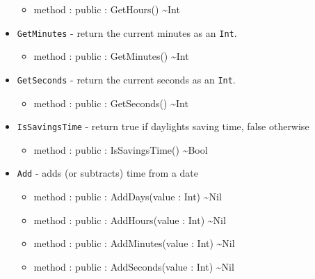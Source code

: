 \documentclass[11pt]{article}
\begin{document}
\begin{itemize}
  \begin{itemize}
  \item method : public : GetHours() \textasciitilde Int
  \end{itemize}
\item \texttt{GetMinutes} - return the current minutes as an
  \texttt{Int}.
  \begin{itemize}
  \item method : public : GetMinutes() \textasciitilde Int
  \end{itemize}
\item \texttt{GetSeconds} - return the current seconds as an
  \texttt{Int}.
  \begin{itemize}
  \item method : public : GetSeconds() \textasciitilde Int
  \end{itemize}
\item \texttt{IsSavingsTime} - return true if daylights saving time,
  false otherwise
  \begin{itemize}
  \item method : public : IsSavingsTime() \textasciitilde Bool
  \end{itemize}
\item \texttt{Add} - adds (or subtracts) time from a date
  \begin{itemize}
  \item method : public : AddDays(value : Int) \textasciitilde Nil
  \item method : public : AddHours(value : Int) \textasciitilde Nil
  \item method : public : AddMinutes(value : Int) \textasciitilde Nil
  \item method : public : AddSeconds(value : Int) \textasciitilde Nil
  \end{itemize}
\end{itemize}
\end{document}

